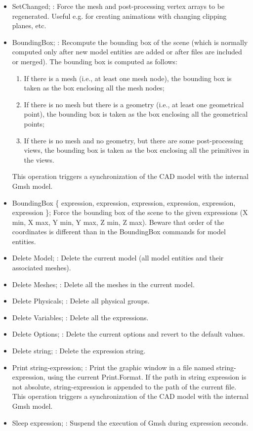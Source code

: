 \documentclass[dvipdfmx, 9pt, a4paper]{article}
\numberwithin{equation}{section}
\begin{document}
\begin{itemize}
\item SetChanged; : Force the mesh and post-processing vertex arrays to be regenerated. Useful e.g. for creating animations with changing clipping planes, etc.
\item BoundingBox; : Recompute the bounding box of the scene (which is normally computed only after new model entities are added or after files are included or merged). The bounding box is computed as follows:
\begin{enumerate}
\item If there is a mesh (i.e., at least one mesh node), the bounding box is taken as the box enclosing all the mesh nodes;
\item If there is no mesh but there is a geometry (i.e., at least one geometrical point), the bounding box is taken as the box enclosing all the geometrical points;
\item If there is no mesh and no geometry, but there are some post-processing views, the bounding box is taken as the box enclosing all the primitives in the views.
\end{enumerate}
This operation triggers a synchronization of the CAD model with the internal Gmsh model.
\item BoundingBox \{ expression, expression, expression, expression, expression, expression \}; Force the bounding box of the scene to the given expressions (X min, X max, Y min, Y max, Z min, Z max). Beware that order of the coordinates is different than in the BoundingBox commands for model entities.
\item Delete Model; : Delete the current model (all model entities and their associated meshes).
\item Delete Meshes; : Delete all the meshes in the current model.
\item Delete Physicals; : Delete all physical groups.
\item Delete Variables; : Delete all the expressions.
\item Delete Options; : Delete the current options and revert to the default values.
\item Delete string; : Delete the expression string.
\item Print string-expression; : Print the graphic window in a file named string-expression, using the current Print.Format. If the path in string expression is not absolute, string-expression is appended to the path of the current file. This operation triggers a synchronization of the CAD model with the internal Gmsh model.
\item Sleep expression; : Suspend the execution of Gmsh during expression seconds.

\end{itemize}
\end{document}
